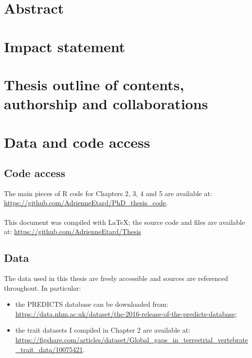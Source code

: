 \documentclass[11pt]{report}
\begin{document}
\begin{refsection}
\begin{comment}
And, last but not least, a very special thank to Tea Trains, Coffee Breaks \& Journal Club Cookies. 
\end{comment}

\chapter*{Abstract} %


\chapter*{Impact statement}%


\chapter*{Thesis outline of contents, authorship and collaborations}


\chapter*{Data and code access}

\section*{Code access}
The main pieces of R code for Chapters 2, 3, 4 and 5 are available at: \url{https://github.com/AdrienneEtard/PhD_thesis_code}.\\
\\
This document was compiled with {\LaTeX}; the source code and files are available at: \url{https://github.com/AdrienneEtard/Thesis}

\section*{Data}

The data used in this thesis are freely accessible and sources are referenced throughout. In particular: 
\begin{itemize}
\item the PREDICTS database \citep{Hudson2014, Hudson2017} can be downloaded from: \url{https://data.nhm.ac.uk/dataset/the-2016-release-of-the-predicts-database};
\item the trait datasets I compiled in Chapter 2 are available at: \url{https://figshare.com/articles/dataset/Global_gaps_in_terrestrial_vertebrate_trait_data/10075421}.


\end{itemize}
\end{refsection}
\end{document}
